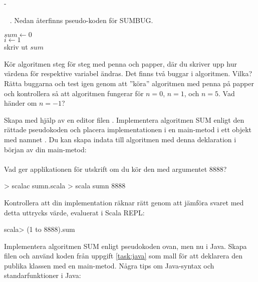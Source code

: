 \SubtaskSolved  -



\QUESTEND









\QUESTBEGIN

\Task  \what~ . Nedan återfinns pseudo-koden för SUMBUG.

\begin{algorithm}[H]

 $sum \leftarrow 0$ \\
 $i \leftarrow 1$  \\
 skriv ut $sum$
\end{algorithm}

\Subtask\Pen Kör algoritmen steg för steg med penna och papper, där du skriver upp hur värdena för respektive variabel ändras. Det finns två buggar i algoritmen. Vilka? Rätta buggarna och test igen genom att ''köra'' algoritmen med penna på papper och kontrollera så att algoritmen fungerar för $n=0$, $n=1$, och $n=5$. Vad händer om $n=-1$?

\Subtask Skapa med hjälp av en editor filen . Implementera algoritmen SUM enligt den rättade pseudokoden och placera implementationen i en main-metod i ett objekt med namnet . Du kan skapa indata  till algoritmen med denna deklaration i början av din main-metod: \\  \\ Vad ger applikationen för utskrift om du kör den med argumentet 8888?

\begin{REPLnonum}
> scalac sumn.scala
> scala sumn 8888
\end{REPLnonum}

\Subtask Kontrollera att din implementation räknar rätt genom att jämföra svaret med detta uttrycks värde, evaluerat i Scala REPL:
\begin{REPLnonum}
scala> (1 to 8888).sum
\end{REPLnonum}

\Subtask Implementera algoritmen SUM enligt pseudokoden ovan, men nu i Java. Skapa filen  och använd koden från uppgift \ref{task:java} som mall för att deklarera den publika klassen  med en main-metod. Några tips om Java-syntax och standarfunktioner i Java:


